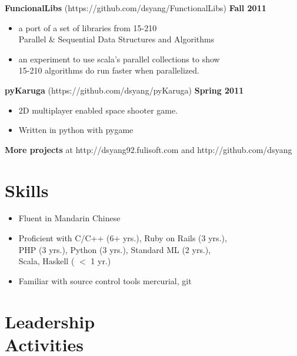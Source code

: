 \documentclass[sectioned]{dsyangres}
\begin{document}
\begin{resume}
\textbf{FuncionalLibs} (https://github.com/dsyang/FunctionalLibs)
\hfill \textbf{Fall 2011}
  \begin{itemize} \itemsep -2pt
    \item a port of a set of libraries from 15-210 \\
      Parallel \& Sequential Data Structures and Algorithms
    \item an experiment to use scala's parallel collections to show \\
      15-210 algorithms do run faster when parallelized.
  \end{itemize}

\textbf{pyKaruga} (https://github.com/dsyang/pyKaruga) \hfill \textbf{Spring 2011}
  \begin{itemize} \itemsep -2pt
    \item 2D multiplayer enabled space shooter game.
    \item Written in python with pygame
  \end{itemize}


\textbf{More projects} at http://dsyang92.fulisoft.com
and http://github.com/dsyang


\section{Skills}

\begin{itemize} \itemsep -2pt
  \item Fluent in Mandarin Chinese
  \item Proficient with C/C++ (6+ yrs.), Ruby on Rails (3 yrs.),\\
    PHP (3 yrs.), Python (3 yrs.), Standard ML (2 yrs.), \\Scala, Haskell
    ( $<$ 1 yr.)
  \item Familiar with source control tools mercurial, git
\end{itemize}

\section{Leadership \\ Activities}


\end{resume}
\end{document}
